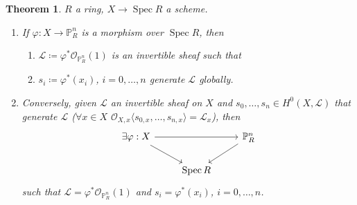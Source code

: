 \documentclass[12pt]{article}
\DeclareMathOperator{\Spec}{Spec}
\newtheorem*{theorem}{Theorem}
\theoremstyle{definition}
\begin{document}
\begin{theorem}
$R$ a ring, $X\rightarrow\Spec R$ a scheme.

\begin{enumerate}[label=\arabic*)]
\item\label{morphism_invertible_sheaf} If $\varphi:X\rightarrow\mathbb P_R^n$ is a morphism over $\Spec R$, then
\begin{enumerate}[label=\arabic*)]
\item $\mathcal L\coloneqq\varphi^*\mathcal O_{\mathbb P_R^n}(1)$ is an invertible sheaf such that
\item $s_i\coloneqq\varphi^*(x_i)$, $i=0,\ldots,n$ generate $\mathcal L$ globally.
\end{enumerate}

\item Conversely, given $\mathcal L$ an invertible sheaf on $X$ and $s_0,\ldots,s_n\in H^0(X,\mathcal L)$ that generate $\mathcal L$ ($\forall x\in X$ $\mathcal O_{X,x}\langle s_{0,x},\ldots,s_{n,x}\rangle=\mathcal L_x$), then
\[\begin{tikzcd}\exists\varphi:X\arrow[rr]\arrow[rd]&&\mathbb P_R^n\arrow[ld]\\&\Spec R\end{tikzcd}\]
such that $\mathcal L=\varphi^*\mathcal O_{\mathbb P_R^n}(1)$ and $s_i=\varphi^*(x_i)$, $i=0,\ldots,n$.
\end{enumerate}
\end{theorem}
\end{document}
